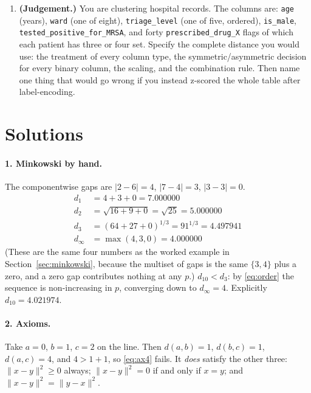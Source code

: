 \documentclass[11pt]{article}
\begin{document}
\begin{enumerate}[leftmargin=*]
  \item \textbf{(Judgement.)} You are clustering hospital records. The
    columns are: \texttt{age} (years), \texttt{ward} (one of eight),
    \texttt{triage\_level} (one of five, ordered), \texttt{is\_male},
    \texttt{tested\_positive\_for\_MRSA}, and forty
    \texttt{prescribed\_drug\_X} flags of which each patient has three or
    four set. Specify the complete distance you would use: the treatment of
    every column type, the symmetric/asymmetric decision for every binary
    column, the scaling, and the combination rule. Then name one thing that
    would go wrong if you instead z-scored the whole table after
    label-encoding.
\end{enumerate}

\section{Solutions}
\label{sec:solutions}

\paragraph{1. Minkowski by hand.}
The componentwise gaps are $|2-6| = 4$, $|7-4| = 3$, $|3-3| = 0$.
\begin{align*}
  d_1 &= 4 + 3 + 0 = 7.000000 \\
  d_2 &= \sqrt{16 + 9 + 0} = \sqrt{25} = 5.000000 \\
  d_3 &= (64 + 27 + 0)^{1/3} = 91^{1/3} = 4.497941 \\
  d_\infty &= \max(4,3,0) = 4.000000
\end{align*}
(These are the same four numbers as the worked example in
Section~\ref{sec:minkowski}, because the multiset of gaps is the same
$\{3,4\}$ plus a zero, and a zero gap contributes nothing at any $p$.)
$d_{10} < d_3$: by \eqref{eq:order} the sequence is non-increasing in $p$,
converging down to $d_\infty = 4$. Explicitly $d_{10} = 4.021974$.

\paragraph{2. Axioms.}
Take $a = 0$, $b = 1$, $c = 2$ on the line. Then $d(a,b) = 1$,
$d(b,c) = 1$, $d(a,c) = 4$, and $4 > 1 + 1$, so \eqref{eq:ax4} fails.
It \emph{does} satisfy the other three: $\|x-y\|^2 \ge 0$ always;
$\|x-y\|^2 = 0$ if and only if $x = y$; and $\|x-y\|^2 = \|y-x\|^2$.
\end{document}
